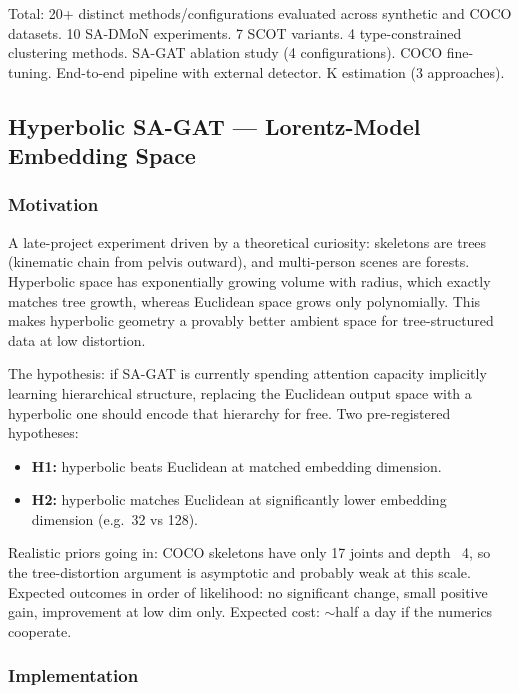 \vspace{0.5em}

Total: 20+ distinct methods/configurations evaluated across synthetic and COCO datasets. 10 SA-DMoN experiments. 7 SCOT variants. 4 type-constrained clustering methods. SA-GAT ablation study (4 configurations). COCO fine-tuning. End-to-end pipeline with external detector. K estimation (3 approaches).


\subsection{Hyperbolic SA-GAT --- Lorentz-Model Embedding Space}

\subsubsection{Motivation}

A late-project experiment driven by a theoretical curiosity: skeletons are trees (kinematic chain from pelvis outward), and multi-person scenes are forests. Hyperbolic space has exponentially growing volume with radius, which exactly matches tree growth, whereas Euclidean space grows only polynomially. This makes hyperbolic geometry a provably better ambient space for tree-structured data at low distortion.

The hypothesis: if SA-GAT is currently spending attention capacity implicitly learning hierarchical structure, replacing the Euclidean output space with a hyperbolic one should encode that hierarchy for free. Two pre-registered hypotheses:

\begin{itemize}
    \item \textbf{H1:} hyperbolic beats Euclidean at matched embedding dimension.
    \item \textbf{H2:} hyperbolic matches Euclidean at significantly lower embedding dimension (e.g.\ 32 vs 128).
\end{itemize}

Realistic priors going in: COCO skeletons have only 17 joints and depth ~4, so the tree-distortion argument is asymptotic and probably weak at this scale. Expected outcomes in order of likelihood: no significant change, small positive gain, improvement at low dim only. Expected cost: $\sim$half a day if the numerics cooperate.

\subsubsection{Implementation}

